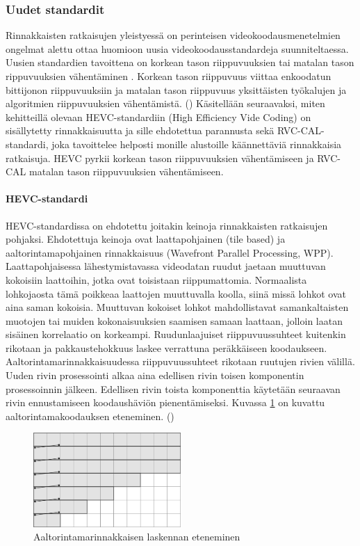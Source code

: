 \subsubsection{Uudet standardit}

Rinnakkaisten ratkaisujen yleistyessä on perinteisen videokoodausmenetelmien
ongelmat alettu ottaa huomioon uusia
videokoodausstandardeja suunniteltaessa. Uusien standardien tavoittena on korkean
tason riippuvuuksien tai matalan tason rippuvuuksien vähentäminen . Korkean
tason riippuvuus viittaa enkoodatun bittijonon riippuvuuksiin ja matalan
tason riippuvuus yksittäisten työkalujen ja algoritmien riippuvuuksien
vähentämistä. (\citealt{choi}) Käsitellään seuraavaksi, miten kehitteillä
olevaan HEVC-standardiin (High Efficiency Vide Coding) on sisällytetty rinnakkaisuutta ja sille ehdotettua
parannusta sekä RVC-CAL-standardi, joka tavoittelee helposti monille alustoille
käännettäviä rinnakkaisia ratkaisuja. HEVC pyrkii korkean tason riippuvuuksien
vähentämiseen ja RVC-CAL matalan tason riippuvuuksien vähentämiseen.

\setcounter{secnumdepth}{5}

\paragraph{HEVC-standardi}
HEVC-standardissa on ehdotettu joitakin keinoja rinnakkaisten
ratkaisujen pohjaksi. Ehdotettuja keinoja ovat laattapohjainen (tile based) ja
aaltorintamapohjainen rinnakkaisuus (Wavefront Parallel Processing, WPP).
Laattapohjaisessa lähestymistavassa videodatan ruudut jaetaan muuttuvan
kokoisiin laattoihin, jotka ovat toisistaan riippumattomia. Normaalista
lohkojaosta tämä poikkeaa laattojen muuttuvalla koolla, siinä missä lohkot
ovat aina saman kokoisia. Muuttuvan kokoiset lohkot mahdollistavat
samankaltaisten muotojen tai muiden kokonaisuuksien saamisen samaan laattaan,
jolloin laatan sisäinen korrelaatio on korkeampi. Ruudunlaajuiset
riippuvuussuhteet kuitenkin rikotaan ja pakkaustehokkuus laskee verrattuna
peräkkäiseen koodaukseen. Aaltorintamarinnakkaisuudessa riippuvuussuhteet
rikotaan ruutujen rivien välillä. Uuden rivin prosessointi alkaa aina edellisen
rivin toisen komponentin prosessoinnin jälkeen. Edellisen rivin toista
komponenttia käytetään seuraavan rivin ennustamiseen koodaushäviön
pienentämiseksi. Kuvassa \ref{fig:wpp} on kuvattu aaltorintamakoodauksen
eteneminen. (\citealt{chi})

\begin{figure}[ht]
	\centering
	\includegraphics[width=0.5\textwidth]{WPP.jpg}
	\caption{Aaltorintamarinnakkaisen laskennan eteneminen}
	\label{fig:wpp}
\end{figure}

